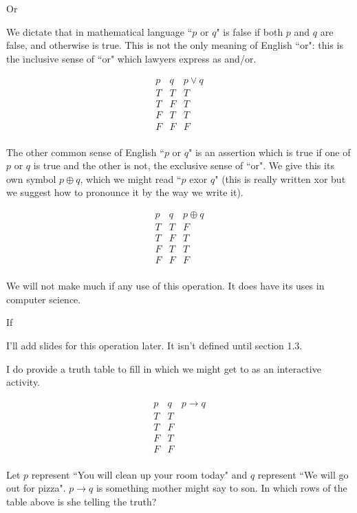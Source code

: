 \documentclass{slides}
\begin{document}
\begin{slide}

{\Large Or}

We dictate that in mathematical language ``$p$ or $q$" is false if both $p$ and $q$ are false, and otherwise is true.
This is not the only meaning of English ``or":  this is the inclusive sense of ``or" which lawyers express as and/or.

$$\begin{array}{cc|c}

p & q & p \vee q \\ \hline
T & T & T\\
T & F & T\\
F & T & T\\
F & F & F\\
\end{array}$$

The other common sense of English ``$p$ or $q$" is an assertion which is true if one of $p$ or $q$ is true and the other is not, the exclusive sense of ``or".  We give this its own symbol $p \oplus q$, which we might read ``$p$ exor $q$" (this is really written xor but we suggest how to pronounce it by the way we write it).

$$\begin{array}{cc|c}

p & q & p \oplus q \\ \hline
T & T & F\\
T & F & T\\
F & T & T\\
F & F & F\\
\end{array}$$

We will not make much if any use of this operation.  It does have its uses in computer science.


\end{slide}

\begin{slide}

{\Large If}

I'll add slides for this operation later.  It isn't defined until section 1.3.

I do provide a truth table to fill in which we might get to as an interactive activity.

$$\begin{array}{cc|c}

p & q & p \rightarrow q \\ \hline
T & T & \\
T & F & \\
F & T & \\
F & F & \\
\end{array}$$

Let $p$ represent ``You will clean up your room today" and $q$ represent ``We will go out for pizza".
$p \rightarrow q$ is something mother might say to son.  In which rows of the table above is she telling the truth?

\end{slide}
\end{document}
